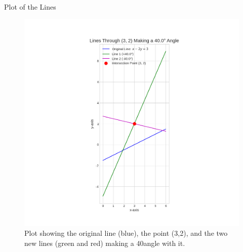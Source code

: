 \documentclass{beamer}
\begin{document}
\begin{frame}{Plot of the Lines}
\centering
\begin{figure}[h!]
    \centering
    \includegraphics[width=0.7\columnwidth]{figs/fig1.png}
    \caption{Plot showing the original line (blue), the point (3,2), and the two new lines (green and red) making a 40\degree angle with it.}
\end{figure}
\end{frame}
\end{document}
